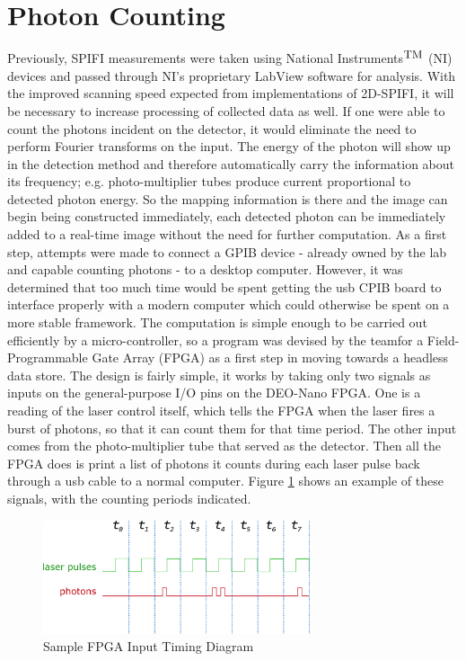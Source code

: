 \documentclass[12pt]{article}
\begin{document}
\section*{Photon Counting}
Previously, SPIFI measurements were taken using National Instruments$^\textnormal{\small TM}$ (NI) devices and passed through NI's proprietary LabView software for analysis. With the improved scanning speed expected from implementations of 2D-SPIFI, it will be necessary to increase processing of collected data as well. If one were able to count the photons incident on the detector, it would eliminate the need to perform Fourier transforms on the input. The energy of the photon will show up in the detection method  and therefore automatically carry the information about its frequency; e.g. photo-multiplier tubes produce current proportional to detected photon energy. So the mapping information is there and the image can begin being constructed immediately, each detected photon can be immediately added to a real-time image without the need for further computation. As a first step, attempts were made to connect a GPIB device - already owned by the lab and capable counting photons - to a desktop computer. However, it was determined that too much time would be spent getting the usb CPIB board to interface properly with a modern computer which could otherwise be spent on a more stable framework. The computation is simple enough to be carried out efficiently by a micro-controller, so a program was devised by the teamfor a Field-Programmable Gate Array (FPGA) as a first step in moving towards a headless data store. The design is fairly simple, it works by taking only two signals as inputs on the general-purpose I/O pins on the DEO-Nano FPGA. One is a reading of the laser control itself, which tells the FPGA when the laser fires a burst of photons, so that it can count them for that time period. The other input comes from the photo-multiplier tube that served as the detector. Then all the FPGA does is print a list of photons it counts during each laser pulse back through a usb cable to a normal computer. Figure \ref{fig:timing} shows an example of these signals, with the counting periods indicated.

\begin{figure}[ht]
	\centering
	\includegraphics[width=0.7\textwidth]{sample-timing-diagram}
	\caption{Sample FPGA Input Timing Diagram}
	\label{fig:timing}
\end{figure}
\end{document}
